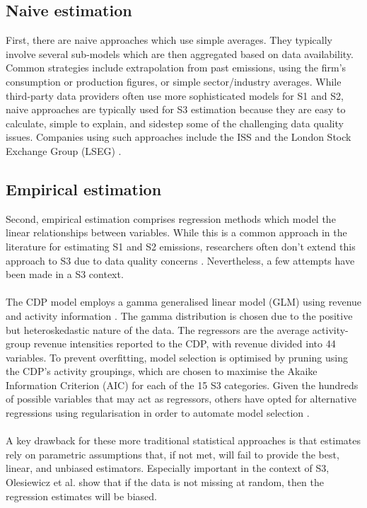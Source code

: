 \documentclass[12pt,twoside]{report}
\begin{document}
\subsection{Naive estimation}
First, there are naive approaches which use simple averages. They typically involve several sub-models which are then aggregated based on data availability. Common strategies include extrapolation from past emissions, using the firm's consumption or production figures, or simple sector/industry averages. While third-party data providers often use more sophisticated models for S1 and S2, naive approaches are typically used for S3 estimation because they are easy to calculate, simple to explain, and sidestep some of the challenging data quality issues. Companies using such approaches include the ISS \cite{iss2023} and the London Stock Exchange Group (LSEG) \cite{lseg2023}.

\subsection{Empirical estimation}

Second, empirical estimation comprises regression methods which model the linear relationships between variables. While this is a common approach in the literature for estimating S1 and S2 emissions, researchers often don't extend this approach to S3 due to data quality concerns \cite{GoldhammerEtAl2017, KalesnikVitali2022}. Nevertheless, a few attempts have been made in a S3 context.
\\ \\
The CDP model employs a gamma generalised linear model (GLM) using revenue and activity information \cite{cdp2023b}. The gamma distribution is chosen due to the positive but heteroskedastic nature of the data. The regressors are the average activity-group revenue intensities reported to the CDP, with revenue divided into 44 variables. To prevent overfitting, model selection is optimised by pruning using the CDP's activity groupings, which are chosen to maximise the Akaike Information Criterion (AIC) for each of the 15 S3 categories. Given the hundreds of possible variables that may act as regressors, others have opted for alternative regressions using regularisation in order to automate model selection \cite{CaiXia2023}.
\\ \\
A key drawback for these more traditional statistical approaches is that estimates rely on parametric assumptions that, if not met, will fail to provide the best, linear, and unbiased estimators. Especially important in the context of S3, Olesiewicz et al. \cite{olesiewicz2021} show that if the data is not missing at random, then the regression estimates will be biased.
\end{document}
